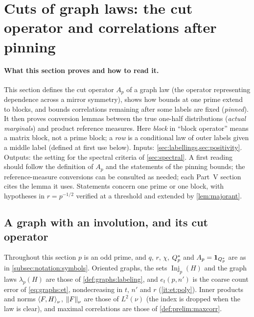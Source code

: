 
\section{Cuts of graph laws: the cut operator and correlations after pinning}\label{sec:cuts}

\paragraph{What this section proves and how to read it.}
This section defines the cut operator $A_p$ of a graph law (the
operator representing dependence across a mirror symmetry), shows
how bounds at one prime extend to blocks, and bounds correlations
remaining after some labels are fixed (\emph{pinned}). It then
proves conversion lemmas between the true one-half distributions
(\emph{actual marginals}) and product reference measures. Here
\emph{block} in ``block operator'' means a matrix block, not a
prime block; a \emph{row} is a conditional law of outer labels given
a middle label (defined at first use below). Inputs:
\cref{sec:labellings,sec:positivity}. Outputs: the setting for the
spectral criteria of \cref{sec:spectral}. A first reading should
follow the definition of $A_p$ and the statements of the pinning
bounds; the reference-measure conversions can be consulted as
needed; each Part~V section cites the lemma it uses. Statements
concern one prime or one block, with hypotheses in $r=p^{-1/2}$
verified at a threshold and extended by \cref{lem:majorant}.

\subsection{A graph with an involution, and its cut operator}\label{subsec:cuts:data}

Throughout this section $p$ is an odd prime, and $q$, $r$, $\chi$, $Q_{p}^{*}$ and
$A_{p}=\mathbf 1_{Q_{p}^{*}}$ are as in \cref{subsec:notation:symbols}. Oriented graphs, the
sets $\operatorname{Inj}_p(H)$ and the graph laws $\lambda_p(H)$ are those of
\cref{def:graphs:labeling}, and $e_t(p,n')$ is the coarse count error of
\eqref{eq:graphs:et}, nondecreasing in $t$, $n'$ and $r$ (\ref{it:et:poly}).
Inner products and norms $\left\langle F,H\right\rangle_\nu$, $\left\|F\right\|_\nu$ are those of $L^2(\nu)$
(the index is dropped when the law is clear), and maximal correlations are
those of \cref{def:prelim:maxcorr}.

